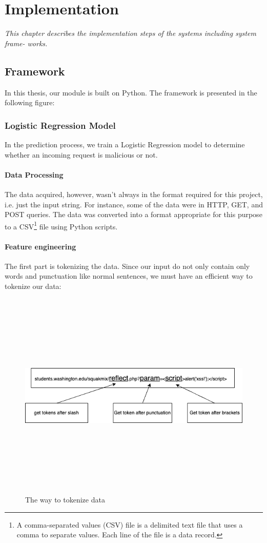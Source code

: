 \chapter{Implementation}
\label{chap:implementation}
	\textit{This chapter describes the implementation steps of the systems including system frame- works.}
\minitoc


\section{Framework}
\label{sec:framework}
In this thesis, our module is built on Python. The framework is presented in the following figure: 

\subsection{Logistic Regression Model}
In the prediction process, we train a Logistic Regression model to determine whether an incoming request is malicious or not.
\subsubsection{Data Processing}
The data acquired, however, wasn't always in the format required for this project, i.e. just the input string. For instance, some of the data were in HTTP, GET, and POST queries. The data was converted into a format appropriate for this purpose to a CSV\footnote{A comma-separated values (CSV) file is a delimited text file that uses a comma to separate values. Each line of the file is a data record.} file using Python scripts.
\subsubsection{Feature engineering}
The first part is tokenizing the data. Since our input do not only contain only words and punctuation like normal sentences, we must have an efficient way to tokenize our data:

\begin{figure}[!h]
	\centering
	\includegraphics[width=\linewidth, height=10cm,keepaspectratio]{figures/implement1.png}
  \caption{The way to tokenize data}
\end{figure} 


